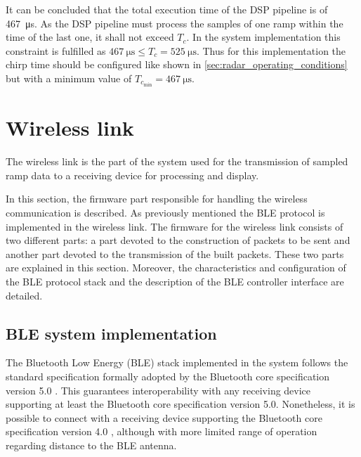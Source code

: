 It can be concluded that the total execution time of the DSP pipeline is of \SI{467}{\micro\second}. As the DSP pipeline must process the samples of one ramp within the time of the last one, it shall not exceed $T_c$. In the system implementation this constraint is fulfilled as $\SI{467}{\micro\second} \le T_c = \SI{525}{\micro\second}$. Thus for this implementation the chirp time should be configured like shown in \cref{sec:radar_operating_conditions} but with a minimum value of $T_{c_{\min}} = \SI{467}{\micro\second}$.

\section{Wireless link} \label{sec:wireless_link}

The wireless link is the part of the system used for the transmission of sampled ramp data to a receiving device for processing and display.

In this section, the firmware part responsible for handling the wireless communication is described. As previously mentioned the BLE protocol is implemented in the wireless link. The firmware for the wireless link consists of two different parts: a part devoted to the construction of packets to be sent and another part devoted to the transmission of the built packets. These two parts are explained in this section. Moreover, the characteristics and configuration of the BLE protocol stack and the description of the BLE controller interface are detailed.

\subsection{BLE system implementation}\label{sec:ble-system-implementation}


The Bluetooth Low Energy (BLE) stack implemented in the system follows the standard specification formally adopted by the Bluetooth core specification version 5.0 \cite{Bluetooth52}. This guarantees interoperability with any receiving device supporting at least the Bluetooth core specification version 5.0. Nonetheless, it is possible to connect with a receiving device supporting the Bluetooth core specification version 4.0 \cite{Bluetooth40}, although with more limited range of operation regarding distance to the BLE antenna.

